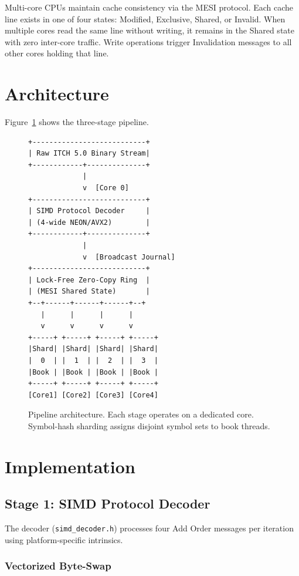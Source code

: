\documentclass[conference]{IEEEtran}
\begin{document}
Multi-core CPUs maintain cache consistency via the MESI protocol. Each cache line exists in one of four states: Modified, Exclusive, Shared, or Invalid. When multiple cores read the same line without writing, it remains in the Shared state with zero inter-core traffic. Write operations trigger Invalidation messages to all other cores holding that line.

\section{Architecture}

Figure~\ref{fig:architecture} shows the three-stage pipeline.

\begin{figure}[H]
\centering
\begin{verbatim}
+---------------------------+
| Raw ITCH 5.0 Binary Stream|
+------------+--------------+
             |
             v  [Core 0]
+---------------------------+
| SIMD Protocol Decoder     |
| (4-wide NEON/AVX2)        |
+------------+--------------+
             |
             v  [Broadcast Journal]
+---------------------------+
| Lock-Free Zero-Copy Ring  |
| (MESI Shared State)       |
+--+------+------+------+--+
   |      |      |      |
   v      v      v      v
+-----+ +-----+ +-----+ +-----+
|Shard| |Shard| |Shard| |Shard|
|  0  | |  1  | |  2  | |  3  |
|Book | |Book | |Book | |Book |
+-----+ +-----+ +-----+ +-----+
[Core1] [Core2] [Core3] [Core4]
\end{verbatim}
\caption{Pipeline architecture. Each stage operates on a dedicated core. Symbol-hash sharding assigns disjoint symbol sets to book threads.}
\label{fig:architecture}
\end{figure}

\section{Implementation}

\subsection{Stage 1: SIMD Protocol Decoder}

The decoder (\texttt{simd\_decoder.h}) processes four Add Order messages per iteration using platform-specific intrinsics.

\subsubsection{Vectorized Byte-Swap}
\end{document}
